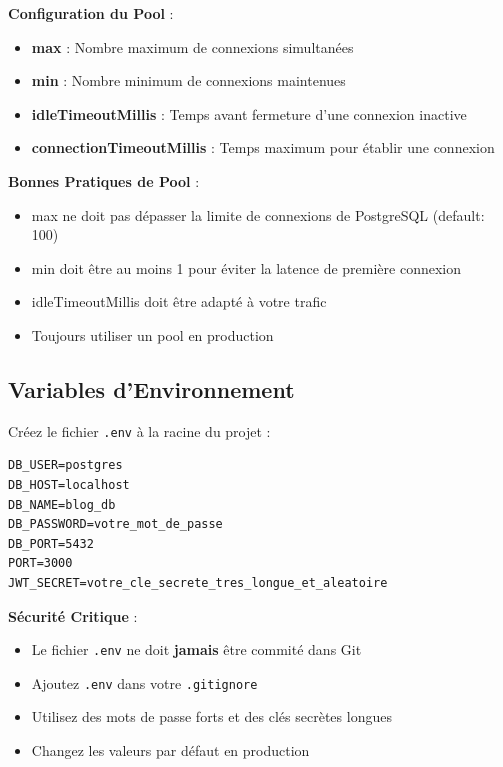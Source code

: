 \begin{definitionbox}
    \textbf{Configuration du Pool} :
    \begin{itemize}
        \item \textbf{max} : Nombre maximum de connexions simultanées
        \item \textbf{min} : Nombre minimum de connexions maintenues
        \item \textbf{idleTimeoutMillis} : Temps avant fermeture d'une connexion inactive
        \item \textbf{connectionTimeoutMillis} : Temps maximum pour établir une connexion
    \end{itemize}
\end{definitionbox}

\begin{bestpracticebox}
    \textbf{Bonnes Pratiques de Pool} :
    \begin{itemize}
        \item max ne doit pas dépasser la limite de connexions de PostgreSQL (default: 100)
        \item min doit être au moins 1 pour éviter la latence de première connexion
        \item idleTimeoutMillis doit être adapté à votre trafic
        \item Toujours utiliser un pool en production
    \end{itemize}
\end{bestpracticebox}

\subsection{Variables d'Environnement}

Créez le fichier \texttt{.env} à la racine du projet :

\begin{lstlisting}[style=bash, caption=.env - Variables d'environnement]
DB_USER=postgres
DB_HOST=localhost
DB_NAME=blog_db
DB_PASSWORD=votre_mot_de_passe
DB_PORT=5432
PORT=3000
JWT_SECRET=votre_cle_secrete_tres_longue_et_aleatoire
\end{lstlisting}

\begin{warningbox}
    \textbf{Sécurité Critique} :
    \begin{itemize}
        \item Le fichier \texttt{.env} ne doit \textbf{jamais} être commité dans Git
        \item Ajoutez \texttt{.env} dans votre \texttt{.gitignore}
        \item Utilisez des mots de passe forts et des clés secrètes longues
        \item Changez les valeurs par défaut en production
    \end{itemize}
\end{warningbox}

